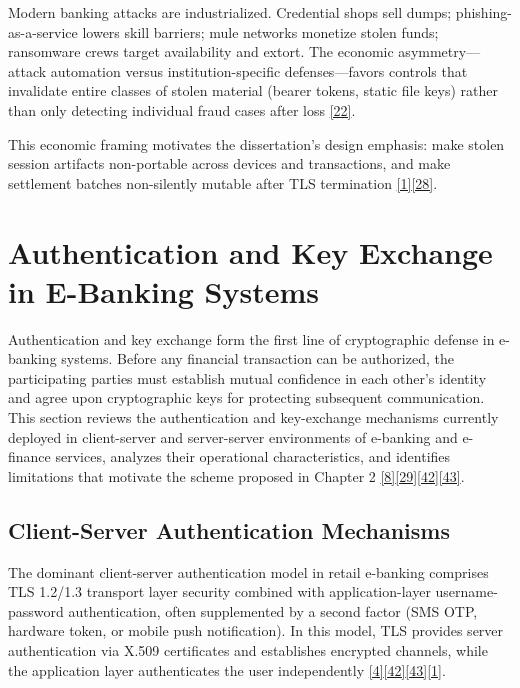 \indent Modern banking attacks are industrialized. Credential shops sell dumps; phishing-as-a-service lowers skill barriers; mule networks monetize stolen funds; ransomware crews target availability and extort. The economic asymmetry---attack automation versus institution-specific defenses---favors controls that invalidate entire classes of stolen material (bearer tokens, static file keys) rather than only detecting individual fraud cases after loss \hyperref[ref:22]{[22]}.

\indent This economic framing motivates the dissertation's design emphasis: make stolen session artifacts non-portable across devices and transactions, and make settlement batches non-silently mutable after TLS termination \hyperref[ref:1]{[1]}\hyperref[ref:28]{[28]}.

\section{Authentication and Key Exchange in E-Banking Systems}

\indent Authentication and key exchange form the first line of cryptographic defense in e-banking systems. Before any financial transaction can be authorized, the participating parties must establish mutual confidence in each other's identity and agree upon cryptographic keys for protecting subsequent communication. This section reviews the authentication and key-exchange mechanisms currently deployed in client-server and server-server environments of e-banking and e-finance services, analyzes their operational characteristics, and identifies limitations that motivate the scheme proposed in Chapter 2 \hyperref[ref:8]{[8]}\hyperref[ref:29]{[29]}\hyperref[ref:42]{[42]}\hyperref[ref:43]{[43]}.

\subsection{Client-Server Authentication Mechanisms}

\indent The dominant client-server authentication model in retail e-banking comprises TLS 1.2/1.3 transport layer security combined with application-layer username-password authentication, often supplemented by a second factor (SMS OTP, hardware token, or mobile push notification). In this model, TLS provides server authentication via X.509 certificates and establishes encrypted channels, while the application layer authenticates the user independently \hyperref[ref:4]{[4]}\hyperref[ref:42]{[42]}\hyperref[ref:43]{[43]}\hyperref[ref:1]{[1]}.

